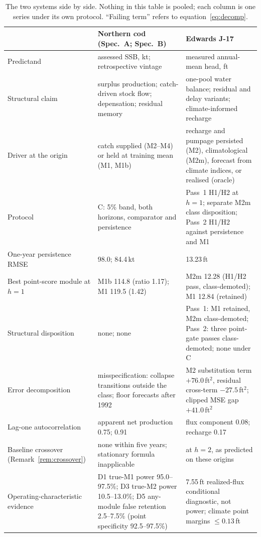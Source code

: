 \begin{table}[!htb]
\centering\small
\caption{The two systems side by side. Nothing in this table is pooled; each column is one series under its own protocol. ``Failing term'' refers to equation~\eqref{eq:decomp}.}
\label{tab:cross}
\begin{tabularx}{\textwidth}{@{}>{\raggedright\arraybackslash}p{}LL@{}}
\toprule
 & Northern cod (Spec.\ A; Spec.\ B) & Edwards J-17 \\
\midrule
Predictand & assessed SSB, kt; retrospective vintage & measured annual-mean head, ft \\
Structural claim & surplus production; catch-driven stock flow; depensation; residual memory & one-pool water balance; residual and delay variants; climate-informed recharge \\
Driver at the origin & catch supplied (M2--M4) or held at training mean (M1, M1b) & recharge and pumpage persisted (M2), climatological (M2m), forecast from climate indices, or realised (oracle) \\
Protocol & C: 5\% band, both horizons, comparator and persistence & Pass~1 H1/H2 at $h=1$; separate M2m class disposition; Pass~2 H1/H2 against persistence and M1 \\
One-year persistence RMSE & 98.0; 84.4\,kt & 13.23\,ft \\
Best point-score module at $h=1$ & M1b 114.8 (ratio 1.17); M1 119.5 (1.42) & M2m 12.28 (H1/H2 pass, class-demoted); M1 12.84 (retained) \\
Structural disposition & none; none & Pass~1: M1 retained, M2m class-demoted; Pass~2: three point-gate passes class-demoted; none under C \\
Error decomposition & misspecification: collapse transitions outside the class; floor forecasts after 1992 & M2 substitution term $+76.0$\,ft$^2$, residual cross-term $-27.5$\,ft$^2$; clipped MSE gap $+41.0$\,ft$^2$ \\
Lag-one autocorrelation & apparent net production 0.75; 0.91 & flux component 0.08; recharge 0.17 \\
Baseline crossover (Remark~\ref{rem:crossover}) & none within five years; stationary formula inapplicable & at $h=2$, as predicted on these origins \\
Operating-characteristic evidence & D1 true-M1 power 95.0--97.5\%; D3 true-M2 power 10.5--13.0\%; D5 any-module false retention 2.5--7.5\% (point specificity 92.5--97.5\%) & 7.55\,ft realized-flux conditional diagnostic, not power; climate point margins $\le0.13$\,ft \\
\bottomrule
\end{tabularx}
\end{table}
